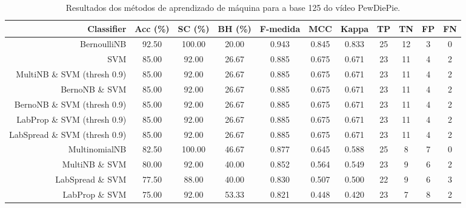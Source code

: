 \begin{table}[!htb]
\centering
\caption{Resultados dos métodos de aprendizado de máquina para a base 125 do vídeo PewDiePie.}
\label{tab:PewDiePie-125}
\begin{tabular}{r|c|c|c|c|c|c|c|c|c|c}
\hline\hline
Classifier & Acc (\%) & SC (\%) & BH (\%) & F-medida & MCC & Kappa & TP & TN & FP & FN \\ \hline
BernoulliNB & 92.50 & 100.00 & 20.00 & 0.943 & 0.845 & 0.833 & 25 & 12 & 3 & 0 \\ 
SVM & 85.00 & 92.00 & 26.67 & 0.885 & 0.675 & 0.671 & 23 & 11 & 4 & 2 \\ 
MultiNB \& SVM (thresh 0.9) & 85.00 & 92.00 & 26.67 & 0.885 & 0.675 & 0.671 & 23 & 11 & 4 & 2 \\ 
BernoNB \& SVM & 85.00 & 92.00 & 26.67 & 0.885 & 0.675 & 0.671 & 23 & 11 & 4 & 2 \\ 
BernoNB \& SVM (thresh 0.9) & 85.00 & 92.00 & 26.67 & 0.885 & 0.675 & 0.671 & 23 & 11 & 4 & 2 \\ 
LabProp \& SVM (thresh 0.9) & 85.00 & 92.00 & 26.67 & 0.885 & 0.675 & 0.671 & 23 & 11 & 4 & 2 \\ 
LabSpread \& SVM (thresh 0.9) & 85.00 & 92.00 & 26.67 & 0.885 & 0.675 & 0.671 & 23 & 11 & 4 & 2 \\ 
MultinomialNB & 82.50 & 100.00 & 46.67 & 0.877 & 0.645 & 0.588 & 25 & 8 & 7 & 0 \\ 
MultiNB \& SVM & 80.00 & 92.00 & 40.00 & 0.852 & 0.564 & 0.549 & 23 & 9 & 6 & 2 \\ 
LabSpread \& SVM & 77.50 & 88.00 & 40.00 & 0.830 & 0.507 & 0.500 & 22 & 9 & 6 & 3 \\ 
LabProp \& SVM & 75.00 & 92.00 & 53.33 & 0.821 & 0.448 & 0.420 & 23 & 7 & 8 & 2 \\ 
\hline\hline
\end{tabular}
\end{table}
